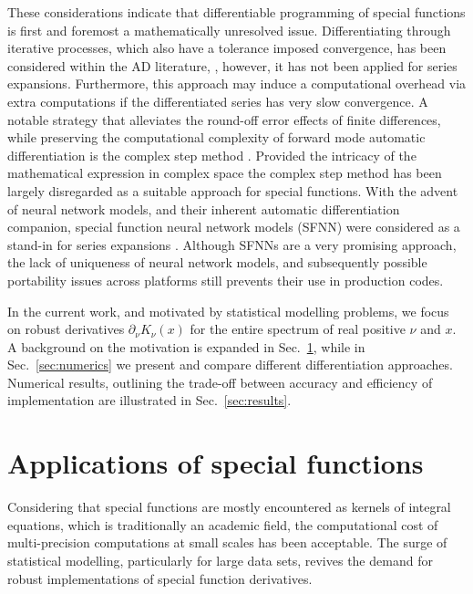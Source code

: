 \documentclass{article}
\begin{document}
These considerations indicate that differentiable programming of special functions is first and foremost a mathematically unresolved issue. Differentiating through iterative processes, which also have a tolerance imposed convergence, has been considered within the AD literature, \cite{bruce1994,gilbert1992,griewank1993}, however, it has not been applied for series expansions. Furthermore, this approach may induce a computational overhead via extra computations if the differentiated series has very slow convergence. A notable strategy that alleviates the round-off error effects of finite differences, while preserving the computational complexity of forward mode automatic differentiation is the complex step method \cite{fike2012automatic}. Provided the intricacy of the mathematical expression in complex space the complex step method has been largely disregarded as a suitable approach for special functions. With the advent of neural network models, and their inherent automatic differentiation companion, special function neural network models (SFNN) were considered as a stand-in for series expansions \cite{marin2021}. Although SFNNs are a very promising approach, the lack of uniqueness of neural network models, and subsequently possible portability issues across platforms still prevents their use in production codes. 

In the current work, and motivated by statistical modelling problems, we focus on robust derivatives $\partial_{\nu}K_{\nu}(x)$ for the entire spectrum of real positive $\nu$ and $x$. A background on the motivation is expanded in Sec.~\ref{sec:apps}, while in Sec.~\ref{sec:numerics} we present and compare different differentiation approaches. Numerical results, outlining the trade-off between accuracy and efficiency of implementation are illustrated in Sec.~\ref{sec:results}. 

\section{Applications of special functions}\label{sec:apps}
Considering that special functions are mostly encountered as kernels of integral equations, which is traditionally an academic field, the computational cost of multi-precision computations at small scales has been acceptable.
The surge of statistical modelling, particularly for large data sets, revives the demand for robust implementations of special function derivatives.  
\end{document}

